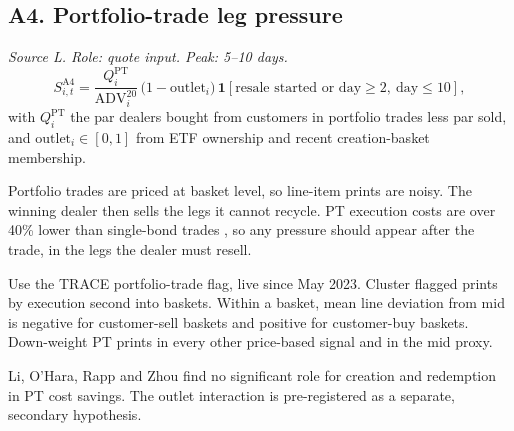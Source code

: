 \documentclass[11pt,letterpaper]{article}
\newcommand{\ind}[1]{\mathbf{1}\!\left[#1\right]}
\newcommand{\ADV}{\mathrm{ADV}}
\begin{document}
\subsection{A4. Portfolio-trade leg pressure}
\emph{Source L. Role: quote input. Peak: 5--10 days.}
\begin{equation}
S^{\mathrm{A4}}_{i,t}=\frac{Q^{\mathrm{PT}}_{i}}{\ADV^{20}_i}\,\bigl(1-\mathrm{outlet}_i\bigr)\,\ind{\text{resale started or day}\ge2,\ \text{day}\le10},
\end{equation}
with $Q^{\mathrm{PT}}_i$ the par dealers bought from customers in portfolio trades less par sold, and $\mathrm{outlet}_i\in[0,1]$ from ETF ownership and recent creation-basket membership.
\begin{spec}
\item[Mechanism and evidence.] Portfolio trades are priced at basket level, so line-item prints are noisy. The winning dealer then sells the legs it cannot recycle. PT execution costs are over 40\% lower than single-bond trades \cite{mt2023}, so any pressure should appear after the trade, in the legs the dealer must resell.
\item[Build.] Use the TRACE portfolio-trade flag, live since May 2023. Cluster flagged prints by execution second into baskets. Within a basket, mean line deviation from mid is negative for customer-sell baskets and positive for customer-buy baskets. Down-weight PT prints in every other price-based signal and in the mid proxy.
\item[Open question.] Li, O'Hara, Rapp and Zhou \cite{lorz2023} find no significant role for creation and redemption in PT cost savings. The outlet interaction is pre-registered as a separate, secondary hypothesis.
\end{spec}
\end{document}
